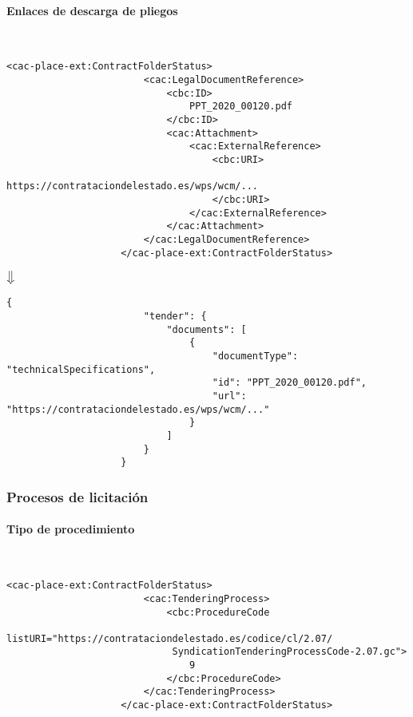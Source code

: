             \paragraph{Enlaces de descarga de pliegos} \mbox{}\\
                \begin{lstlisting}[language=lXML]
                    <cac-place-ext:ContractFolderStatus>
                        <cac:LegalDocumentReference>
                            <cbc:ID>
                                PPT_2020_00120.pdf
                            </cbc:ID>
                            <cac:Attachment>
                                <cac:ExternalReference>
                                    <cbc:URI>
                                        https://contrataciondelestado.es/wps/wcm/...
                                    </cbc:URI>
                                </cac:ExternalReference>
                            </cac:Attachment>
                        </cac:LegalDocumentReference>
                    </cac-place-ext:ContractFolderStatus>
                \end{lstlisting}
                
                \begin{center}
                    $\big\Downarrow$
                \end{center}
                
                \begin{lstlisting}[language=lJSON]
                    {
                        "tender": {
                            "documents": [
                                {
                                    "documentType": "technicalSpecifications",
                                    "id": "PPT_2020_00120.pdf",
                                    "url": "https://contrataciondelestado.es/wps/wcm/..."
                                }
                            ]
                        }
                    }
                \end{lstlisting}
                
        \subsubsection{Procesos de licitación}
            \paragraph{Tipo de procedimiento} \mbox{}\\
                \begin{lstlisting}[language=lXML]
                    <cac-place-ext:ContractFolderStatus>
                        <cac:TenderingProcess>
                            <cbc:ProcedureCode
                             listURI="https://contrataciondelestado.es/codice/cl/2.07/
                             SyndicationTenderingProcessCode-2.07.gc">
                                9
                            </cbc:ProcedureCode>
                        </cac:TenderingProcess>
                    </cac-place-ext:ContractFolderStatus>
                \end{lstlisting}
                
